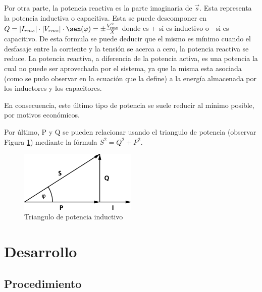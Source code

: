 \documentclass{article}
\begin{document}
        Por otra parte, la potencia reactiva es la parte imaginaria de $\vec{s}$. Esta representa la potencia inductiva o capacitiva. Esta se puede descomponer en $ Q = |I_{rms}| \cdot |V_{rms}| \cdot \sen (\varphi)= \pm \frac{V_\text{rms}^2}{X}$ donde es + si es inductivo o - si es capacitivo.
        De esta formula se puede deducir que el mismo es mínimo cuando el desfasaje entre la corriente y la tensión se acerca a cero, 
        la potencia reactiva se reduce. La potencia reactiva, a diferencia de la potencia activa, es una potencia la cual no puede ser aprovechada por el sistema, 
        ya que la misma esta asociada (como se pudo observar en la ecuación que la define) a la energía almacenada por los inductores y los capacitores.\par

        En consecuencia, este último tipo de potencia se suele reducir al mínimo posible, por motivos económicos.

        Por último, P y Q se pueden relacionar usando el triangulo de potencia (observar Figura \ref{fig:triangulo_de_potencia}) mediante la fórmula $S^2=Q^2+P^2$. 
        \begin{figure}[h!] %
            \centering
            \includegraphics[width=0.5\textwidth]{Trojkat-mocy.png} %
            \caption{Triangulo de potencia inductivo}
            \label{fig:triangulo_de_potencia} %
        \end{figure}

    \indent
    \section{Desarrollo}

    \subsection{Procedimiento}
\end{document}
